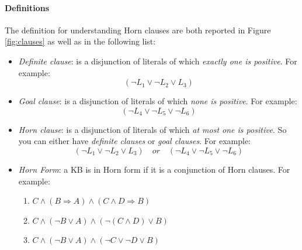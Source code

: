 \documentclass[10pt,a4paper]{article}
\begin{document}
\paragraph{Definitions}
The definition for understanding Horn clauses are both reported in Figure \ref{fig:clauses} as well as in the following list:
\begin{itemize}
\item \textit{Definite clause}: is a disjunction of literals of which \textit{exactly one is positive}. For example:\[(\neg L_1 \vee \neg L_2 \vee L_3)\]
\item \textit{Goal clause}: is a disjunction of literals of which \textit{none is positive}. For example:\[(\neg L_4 \vee \neg L_5 \vee \neg L_6)\]
\item \textit{Horn clause}: is a disjunction of literals of which \textit{at most one is positive}. So you can either have \textit{definite clauses} or \textit{goal clauses}. For example:\[(\neg L_1 \vee \neg L_2 \vee L_3)\quad or\quad (\neg L_4 \vee \neg L_5 \vee \neg L_6)\]
\item \textit{Horn Form}: a KB is in Horn form if it is a conjunction of Horn clauses. For example:

	\begin{enumerate}
	\item $C \wedge (B\Rightarrow A)\wedge(C\wedge D\Rightarrow B)$
	\item $C \wedge (\neg B \vee A)\wedge(\neg(C\wedge D)\vee B)$
	\item $C \wedge (\neg B \vee A)\wedge(\neg C\vee \neg D \vee B)$
	\end{enumerate}
	
\end{itemize}
\end{document}
